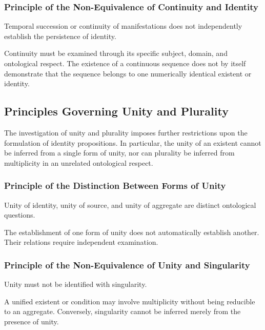 \subsubsection{Principle of the Non-Equivalence of Continuity and Identity}

Temporal succession or continuity of manifestations
does not independently establish the persistence of
identity.

Continuity must be examined through its specific subject,
domain, and ontological respect. The existence of a
continuous sequence does not by itself demonstrate that
the sequence belongs to one numerically identical
existent or identity.


\subsection{Principles Governing Unity and Plurality}

The investigation of unity and plurality imposes further
restrictions upon the formulation of identity propositions.
In particular, the unity of an existent cannot be inferred
from a single form of unity, nor can plurality be inferred
from multiplicity in an unrelated ontological respect.

\subsubsection{Principle of the Distinction Between Forms of Unity}

Unity of identity, unity of source, and unity of aggregate
are distinct ontological questions.

The establishment of one form of unity does not
automatically establish another. Their relations require
independent examination.

\subsubsection{Principle of the Non-Equivalence of Unity and Singularity}

Unity must not be identified with singularity.

A unified existent or condition may involve multiplicity
without being reducible to an aggregate. Conversely,
singularity cannot be inferred merely from the presence
of unity.


